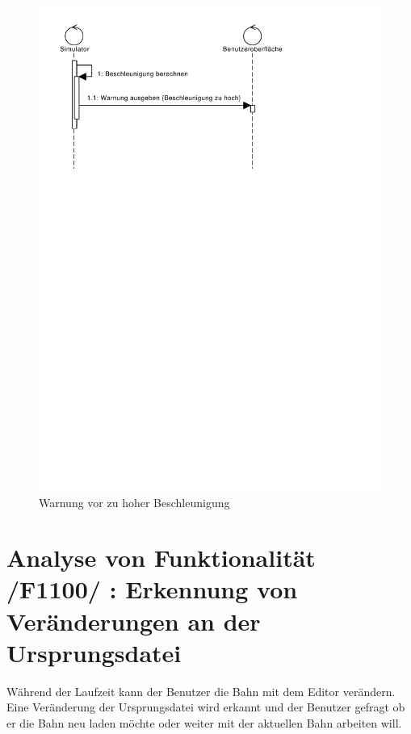 \begin{figure}[h!]
\includegraphics[width=\linewidth]{bilder/Warnung_Beschleunigung}
\caption{Warnung vor zu hoher Beschleunigung}
\end{figure}
\section{Analyse von Funktionalität /F1100/ :  Erkennung von Veränderungen an der Ursprungsdatei}
Während der Laufzeit kann der Benutzer die Bahn mit dem Editor verändern.
Eine Veränderung der Ursprungsdatei wird erkannt und der Benutzer gefragt ob er die Bahn neu laden möchte oder weiter mit der aktuellen Bahn arbeiten will.
